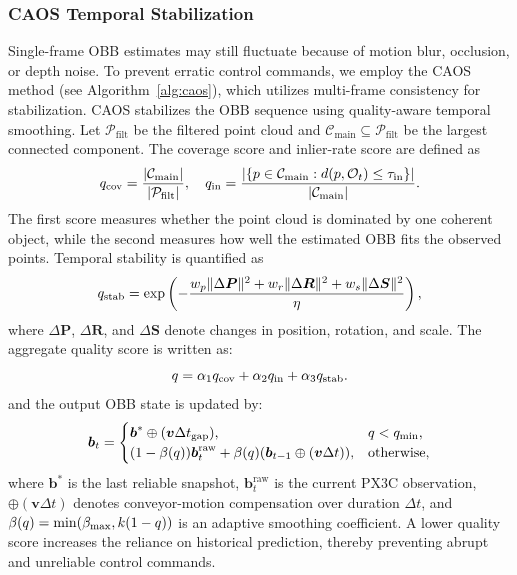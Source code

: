 \subsubsection{CAOS Temporal Stabilization}
Single-frame OBB estimates may still fluctuate because of motion blur, occlusion, or depth noise. To prevent erratic control commands, we employ the CAOS method (see Algorithm~\ref{alg:caos}), which utilizes multi-frame consistency for stabilization. CAOS stabilizes the OBB sequence using quality-aware temporal smoothing. Let $\mathcal{P}_{\text{filt}}$ be the filtered point cloud and $\mathcal{C}_{\text{main}}\subseteq\mathcal{P}_{\text{filt}}$ be the largest connected component. The coverage score and inlier-rate score are defined as
\begin{equation}
q_{\text{cov}}=\frac{|\mathcal{C}_{\text{\text{main}}}|}{|\mathcal{P}_{\text{\text{filt}}}|},\quad
q_{\text{in}}=\frac{\left|\{p\in\mathcal{C}_{\text{\text{main}}}:d(p,\mathcal{O}_{t})\le\tau_{\text{\text{in}}}\}\right|}{|\mathcal{C}_{\text{\text{main}}}|}.
\label{eq:qcov}
\end{equation}
The first score measures whether the point cloud is dominated by one coherent object, while the second measures how well the estimated OBB fits the observed points. Temporal stability is quantified as
\begin{equation}
q_{\text{\text{stab}}}=\exp\left(-\frac{w_p\|\Delta\boldsymbol{P}\|^2+w_r\|\Delta\boldsymbol{R}\|^2+w_s\|\Delta\boldsymbol{S}\|^2}{\eta}\right),
\label{eq:qstab}
\end{equation}
where $\Delta\boldsymbol{P}$, $\Delta\boldsymbol{R}$, and $\Delta\boldsymbol{S}$ denote changes in position, rotation, and scale. The aggregate quality score is written as:
\begin{equation}
q=\alpha_1q_{\text{cov}}+\alpha_2q_{\text{\text{in}}}+\alpha_3q_{\text{\text{stab}}}.
\end{equation}
and the output OBB state is updated by:
\begin{equation}
\boldsymbol{b}_{t}=\begin{cases}
\boldsymbol{b}^{*}\oplus(\boldsymbol{v}\Delta t_{\text{gap}}), & q<q_{\text{\text{min}}},\\
(1-\beta(q))\boldsymbol{b}_{t}^{\text{raw}}+\beta(q)(\boldsymbol{b}_{t-1}\oplus(\boldsymbol{v}\Delta t)), & \mathrm{otherwise},
\end{cases}
\label{eq:caos}
\end{equation}
where $\boldsymbol{b}^{*}$ is the last reliable snapshot, $\boldsymbol{b}_{t}^{\text{raw}}$ is the current PX3C observation, $\oplus(\boldsymbol{v}\Delta t)$ denotes conveyor-motion compensation over duration $\Delta t$, and $\beta(q)=\min(\beta_{\text{\text{max}}},k(1-q))$ is an adaptive smoothing coefficient. A lower quality score increases the reliance on historical prediction, thereby preventing abrupt and unreliable control commands.

